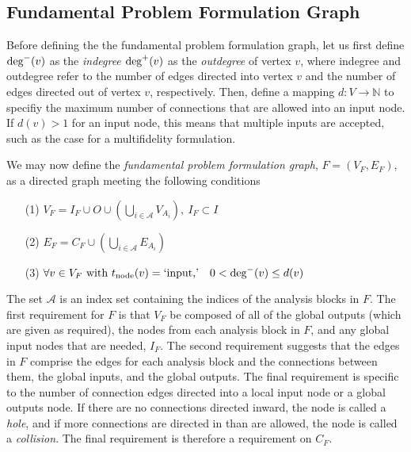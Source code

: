 \subsection{Fundamental Problem Formulation Graph}
Before defining the the fundamental problem formulation graph, let us first define $\textrm{deg}^-(v)$ as the \emph{indegree} $\textrm{deg}^+(v)$ as the \emph{outdegree} of vertex $v$, where indegree and outdegree refer to the number of edges directed into vertex $v$ and the number of edges directed out of vertex $v$, respectively. Then, define a mapping $d:V \to \mathbb{N}$ to specifiy the maximum number of connections that are allowed into an input node.
If $d(v)>1$ for an input node, this means that multiple inputs are accepted, such as the case for a multifidelity formulation.

We may now define the \emph{fundamental problem formulation graph}, $F=(V_F,E_F)$, as a directed graph meeting the following conditions
\begin{enumerate}
\item[(1)] $\displaystyle{V_F = I_F \cup O \cup \left( \bigcup_{i \in \mathcal A} V_{A_i} \right),\ I_F \subset I}$
\item[(2)] $\displaystyle{E_F = C_F \cup \left( \bigcup_{i \in \mathcal A} E_{A_i} \right)}$
\item[(3)] $\displaystyle{\forall v \in V_F \textrm{ with } t_\textrm{node}(v) = \textrm{`input,'}\quad 0 < \textrm{deg}^-(v) \leq d(v)}$
\end{enumerate}
The set $\mathcal A$ is an index set containing the indices of the analysis blocks in $F$. The first requirement for $F$ is that $V_F$ be composed of all of the global outputs (which are given as required), the nodes from each analysis block in $F$, and any global input nodes that are needed, $I_F$. The second requirement suggests that the edges in $F$ comprise the edges for each analysis block and the connections between them, the global inputs, and the global outputs. The final requirement is specific to the number of connection edges directed into a local input node or a global outputs node. If there are no connections directed inward, the node is called a \emph{hole}, and if more connections are directed in than are allowed, the node is called a \emph{collision}. The final requirement is therefore a requirement on $C_F$.

